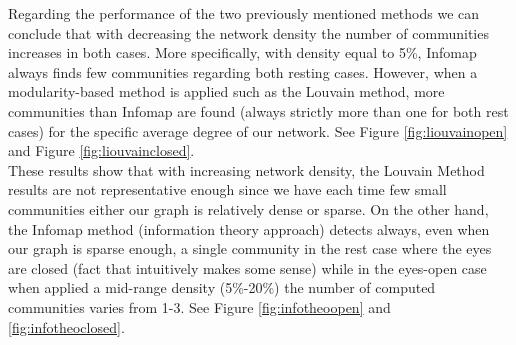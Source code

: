 \documentclass[%
 aip,
 jmp,%
 amsmath,amssymb,
 reprint,%
]{revtex4-1}
\begin{document}
Regarding the performance of the two previously mentioned methods we can conclude that with decreasing the network density the number of communities increases in both cases.
More specifically, with density equal to 5\%, Infomap always finds few communities regarding both resting cases. However, when a modularity-based method is applied such as the Louvain method, more communities than Infomap are found (always strictly more than one for both rest cases) for the specific average degree of our network. See Figure \ref{fig:liouvainopen} and Figure \ref{fig:liouvainclosed}.\\

These results show that with increasing network density, the Louvain Method results are not representative enough since we have each time few small communities either our graph is relatively dense or sparse. On the other hand, the Infomap method (information theory approach) detects always, even when our graph is sparse enough, a single community in the rest case where the eyes are closed (fact that intuitively makes some sense) while in the eyes-open case when applied a mid-range density (5\%-20\%) the number of computed communities varies from 1-3. See Figure \ref{fig:infotheoopen} and \ref{fig:infotheoclosed}.

 	
\end{document}
